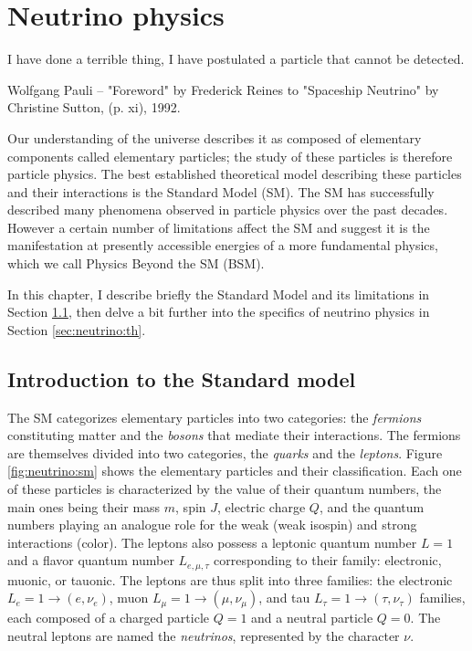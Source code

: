 \chapter{Neutrino physics}
\label{sec:neutrino}

\epigraph{I have done a terrible thing, I have postulated a particle that cannot be detected.}{Wolfgang Pauli -- "Foreword" by Frederick Reines to "Spaceship Neutrino" by Christine Sutton, (p. xi), 1992. }



\minitoc

Our understanding of the universe describes it as composed of elementary components called elementary particles; the study of these particles is therefore particle physics. The best established theoretical model describing these particles and their interactions is the Standard Model (SM).
The SM has successfully described many phenomena observed in particle physics over the past decades. However a certain number of limitations affect the SM and suggest it is the manifestation at presently accessible energies of a more fundamental physics, which we call Physics Beyond the SM (BSM).

In this chapter, I describe briefly the Standard Model and its limitations in Section \ref{sec:neutrinos:sm}, then delve a bit further into the specifics of neutrino physics in Section \ref{sec:neutrino:th}.

\section{Introduction to the Standard model}
\label{sec:neutrinos:sm}

The SM categorizes elementary particles into two categories: the \textit{fermions} constituting matter and the \textit{bosons} that mediate their interactions. The fermions are themselves divided into two categories, the \textit{quarks} and the \textit{leptons}. Figure \ref{fig:neutrino:sm} shows the elementary particles and their classification. Each one of these particles is characterized by the value of their quantum numbers, the main ones being their mass $m$, spin $J$, electric charge $Q$, and the quantum numbers playing an analogue role for the weak (weak isospin) and strong interactions (color). The leptons also possess a leptonic quantum number $L = 1$ and a flavor quantum number $L_{e,\mu,\tau}$ corresponding to their family: electronic, muonic, or tauonic. The leptons are thus split into three families: the electronic $L_e = 1 \rightarrow (e, \nu_e)$, muon $L_\mu = 1 \rightarrow (\mu, \nu_\mu)$, and tau $L_\tau = 1 \rightarrow (\tau, \nu_\tau)$ families, each composed of a charged particle $Q = 1$ and a neutral particle $Q = 0$. The neutral leptons are named the \textit{neutrinos}, represented by the character $\nu$.

